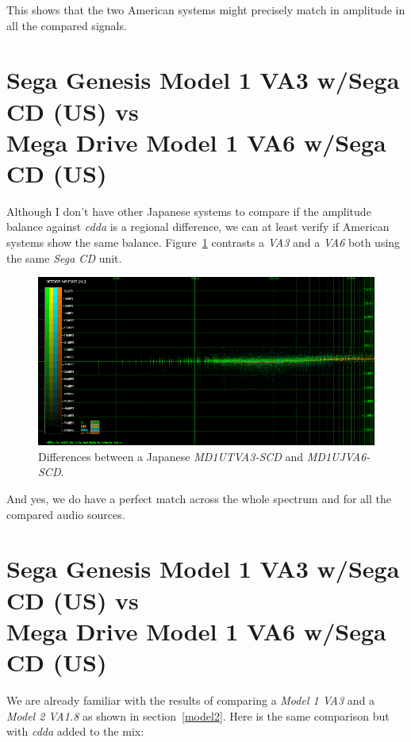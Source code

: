 \documentclass[10pt,a4paper]{report}
\newcommand{\ac}[1]{\textit{\mbox{\acrshort{#1}}}}
\begin{document}
This shows that the two American systems might precisely match in amplitude in all the compared signals.

\section{Sega Genesis Model 1 VA3 w/Sega CD (US) vs\\ Mega Drive Model 1 VA6 w/Sega CD (US)}

Although I don't have other Japanese systems to compare if the amplitude balance against \ac{cdda} is a regional difference, we can at least verify if American systems show the same balance. Figure~\ref{fig:A-MD1UTVA3-SCD-LA_vs_A-MD1UJVA6-SCDD} contrasts a \textit{VA3} and a \textit{VA6} both using the same \textit{Sega CD} unit.

\begin{figure}[H]
	\centering
	\includegraphics[width=1.0\linewidth]{images/results/12-A-MD1UTVA3-SCD-LA_vs_A-MD1UJVA6-SCD.png}
	\caption[A-MD1UTVA3-SCD-LA vs A-MD1UJVA6-SCD]{Differences between a Japanese  \textit{MD1UTVA3-SCD} and \textit{MD1UJVA6-SCD}.}
	\label{fig:A-MD1UTVA3-SCD-LA_vs_A-MD1UJVA6-SCDD}
\end{figure}

And yes, we do have a perfect match across the whole spectrum and for all the compared audio sources.

\section{Sega Genesis Model 1 VA3 w/Sega CD (US) vs\\ Mega Drive Model 1 VA6 w/Sega CD (US)}

We are already familiar with the results of comparing a \textit{Model 1 VA3} and a \textit{Model 2 VA1.8} as shown in section~\ref{model2}. Here is the same comparison but with \ac{cdda} added to the mix:
\end{document}
